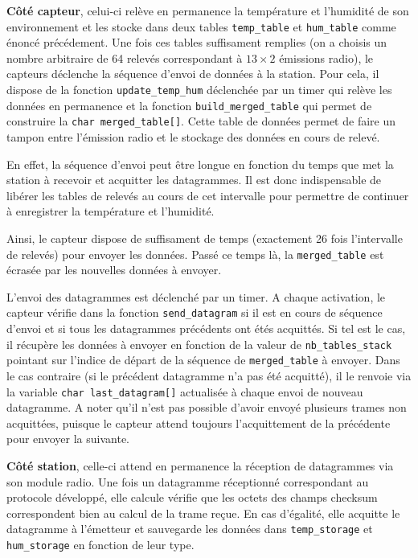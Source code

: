\documentclass[a4paper]{article}
\begin{document}
\vspace{0.3cm}

\textbf{Côté capteur}, celui-ci relève en permanence la température et l'humidité de son environnement et les stocke dans deux tables 
\texttt{temp\_table} et \texttt{hum\_table} comme énoncé précédement. 
Une fois ces tables suffisament remplies (on a choisis un nombre arbitraire de 64 relevés correspondant à $13 \times 2$ émissions radio), 
le capteurs déclenche la séquence d'envoi de données à la station. 
Pour cela, il dispose de la fonction \texttt{update\_temp\_hum} déclenchée par un timer qui relève les données 
en permanence et la fonction \texttt{build\_merged\_table} qui permet de construire la \texttt{char merged\_table[]}. 
Cette table de données permet de faire un tampon entre l'émission radio et le stockage des données en cours de relevé. 

En effet, la séquence d'envoi peut être longue en fonction du temps que met la station à recevoir et acquitter les datagrammes. 
Il est donc indispensable de libérer les tables de relevés au cours de cet intervalle pour permettre de continuer 
à enregistrer la température et l'humidité. 

Ainsi, le capteur dispose de suffisament de temps (exactement 26 fois l'intervalle de relevés) pour envoyer les données. 
Passé ce temps là, la \texttt{merged\_table} est écrasée par les nouvelles données à envoyer. 

L'envoi des datagrammes est déclenché par un timer. A chaque activation, le capteur vérifie dans la fonction 
\texttt{send\_datagram} si il est en cours de séquence d'envoi et si tous les datagrammes précédents ont étés acquittés. 
Si tel est le cas, il récupère les données à envoyer en fonction de la valeur de \texttt{nb\_tables\_stack} pointant sur 
l'indice de départ de la séquence de \texttt{merged\_table} à envoyer. 
Dans le cas contraire (si le précédent datagramme n'a pas été acquitté), il le renvoie via la variable \texttt{char last\_datagram[]}
actualisée à chaque envoi de nouveau datagramme. 
A noter qu'il n'est pas possible d'avoir envoyé plusieurs trames non acquittées, puisque le capteur attend toujours l'acquittement 
de la précédente pour envoyer la suivante. 

\vspace{0.3cm}

\textbf{Côté station}, celle-ci attend en permanence la réception de datagrammes via son module radio. 
Une fois un datagramme réceptionné correspondant au protocole développé, elle calcule vérifie que les octets 
des champs checksum correspondent bien au calcul de la trame reçue. En cas d'égalité, elle acquitte le datagramme à l'émetteur et 
sauvegarde les données dans \texttt{temp\_storage} et \texttt{hum\_storage} en fonction de leur type. 
\end{document}
